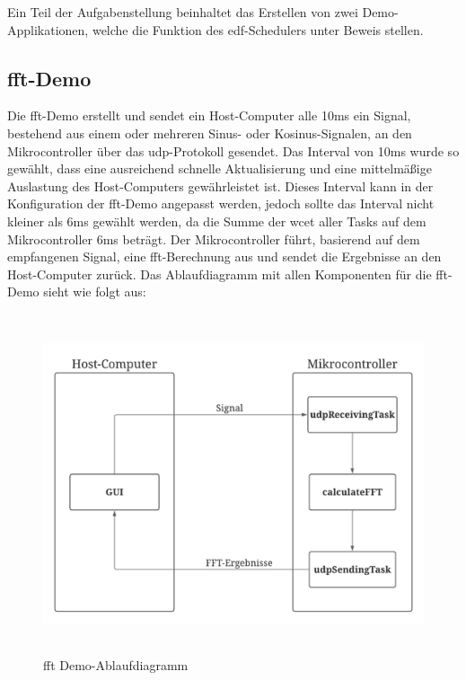 \documentclass[../EDF Master Thesis.tex]{subfiles}
\begin{document}
    Ein Teil der Aufgabenstellung beinhaltet das Erstellen von zwei Demo-Applikationen, welche die Funktion des \ac{edf}-Schedulers unter Beweis stellen.

    \subsection{\ac{fft}-Demo} \label{section:fft_demo}

        Die \ac{fft}-Demo erstellt und sendet ein Host-Computer alle 10ms ein Signal, bestehend aus einem oder mehreren Sinus- oder Kosinus-Signalen, an den Mikrocontroller über das \ac{udp}-Protokoll gesendet.
        Das Interval von 10ms wurde so gewählt, dass eine ausreichend schnelle Aktualisierung und eine mittelmäßige Auslastung des Host-Computers gewährleistet ist.
        Dieses Interval kann in der Konfiguration der \ac{fft}-Demo angepasst werden, jedoch sollte das Interval nicht kleiner als 6ms gewählt werden, da die Summe der \ac{wcet} aller Tasks auf dem Mikrocontroller 6ms beträgt.
        Der Mikrocontroller führt, basierend auf dem empfangenen Signal, eine \ac{fft}-Berechnung aus und sendet die Ergebnisse an den Host-Computer zurück.
        Das Ablaufdiagramm mit allen Komponenten für die \ac{fft}-Demo sieht wie folgt aus:

        \begin{figure}[H]
            \centering
            \includegraphics[height=10cm, width=14cm]{./attachments/FFT Ablauf.pdf}
            \caption{\ac{fft} Demo-Ablaufdiagramm}
            \label{fig:fft_demo_ablaufdiagramm}
        \end{figure}
\end{document}

